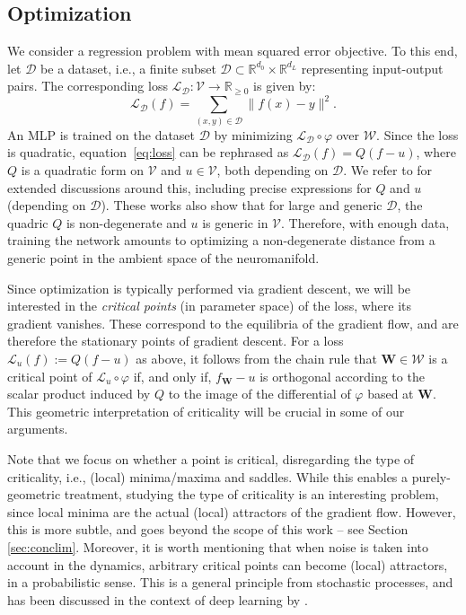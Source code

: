 \documentclass{article} %
\def\eqref#1{equation~\ref{#1}}
\theoremstyle{plain}%
\theoremstyle{definition}
\theoremstyle{remark}
\begin{document}
\subsection{Optimization}\label{sec:backopt}
We consider a regression problem with mean squared error objective. To this end, let $\mathcal{D}$ be a dataset, i.e., a finite subset $\mathcal{D} \subset \mathbb{R}^{d_0} \times \mathbb{R}^{d_L}$ representing input-output pairs. The corresponding loss $\mathcal{L}_{\mathcal{D}}\colon \mathcal{V} \rightarrow \mathbb{R}_{\geq 0}$ is given by: 
\begin{equation}
    \label{eq:loss}
    \mathcal{L}_\mathcal{D}(f) = \sum_{(x,y) \in \mathcal{D}} \| f(x) - y \|^2.
\end{equation}
An MLP is trained on the dataset $\mathcal{D}$ by minimizing $\mathcal{L}_\mathcal{D} \circ \varphi$ over $\mathcal{W}$. Since the loss is quadratic, \eqref{eq:loss} can be rephrased as $\mathcal{L}_\mathcal{D}(f) = Q(f - u)$, where $Q$ is a quadratic form on $\mathcal{V}$ and $u \in \mathcal{V}$, both depending on $\mathcal{D}$. We refer to \cite{trager2019pure, shahverdi2024geometryoptimizationpolynomialconvolutional, kubjas2024geometry} for extended discussions around this, including precise expressions for $Q$ and $u$ (depending on $\mathcal{D}$). These works also show that for large and generic $\mathcal{D}$, the quadric $Q$ is non-degenerate and $u$ is generic in $\mathcal{V}$. Therefore, with enough data, training the network amounts to optimizing a non-degenerate distance from a generic point in the ambient space of the neuromanifold. 


Since optimization is typically performed via gradient descent, we will be interested in the \emph{critical points} (in parameter space) of the loss, where its gradient vanishes. These correspond to the equilibria of the gradient flow, and are therefore the stationary points of gradient descent. For a loss $\mathcal{L}_u(f) := Q(f - u )$ as above, it follows from the chain rule that $\mathbf{W} \in \mathcal{W}$ is a critical point of $\mathcal{L}_u \circ \varphi$ if, and only if, $f_\mathbf{W} - u $ is orthogonal according to the scalar product induced by $Q$ to the image of the differential of $\varphi$ based at $\mathbf{W}$. This geometric interpretation of criticality will be crucial in some of our arguments.

Note that we focus on whether a point is critical, disregarding the type of criticality, i.e., (local) minima/maxima and saddles. While this enables a purely-geometric treatment, studying the type of criticality is an interesting problem, since local minima are the actual (local) attractors of the gradient flow. However, this is more subtle, and goes beyond the scope of this work -- see Section \ref{sec:conclim}.  Moreover, it is worth mentioning that when noise is taken into account in the dynamics, arbitrary critical points can become (local) attractors, in a probabilistic sense. This is a general principle from stochastic processes, and has been discussed in the context of deep learning by \cite{chen2023stochastic}. 
\end{document}
